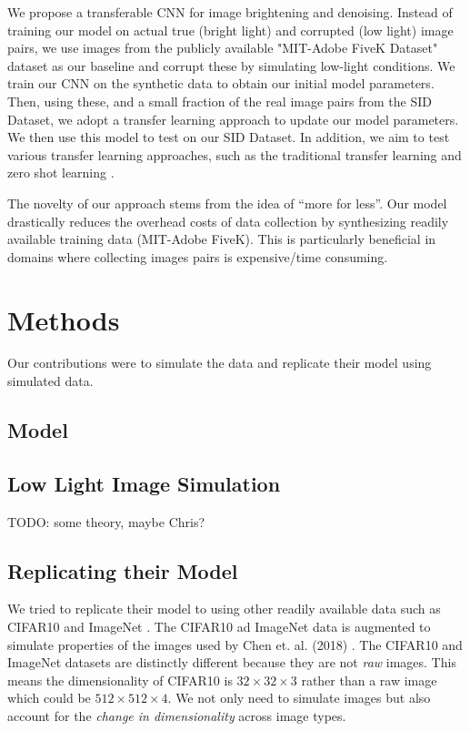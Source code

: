 \documentclass{article}
\begin{document}
We propose a transferable CNN for image brightening and denoising. Instead
of training our model on actual true (bright light) and corrupted
(low light) image pairs, we use images from the publicly available
"MIT-Adobe FiveK Dataset" dataset as our baseline and corrupt these by simulating
low-light conditions. We train our CNN on the synthetic data to obtain our initial
model parameters. Then, using these, and a small fraction of the real image pairs
from the SID Dataset, we adopt a transfer learning \cite{Goodfellow-et-al-2016}
approach to update our model parameters. We then use this model to test on our
SID Dataset. In addition, we aim to test various transfer learning approaches,
such as the traditional transfer learning and zero shot learning \cite{larochelle2008,
  NIPS2009_3650, socher2013zeroshot}.\newline

The novelty of our approach stems from the idea of ``more for less''. Our
model drastically reduces the overhead costs of data collection by
synthesizing readily available training data (MIT-Adobe FiveK). This is
particularly beneficial in domains where collecting images pairs is
expensive/time consuming. 

\section{Methods}

Our contributions were to simulate the data and replicate their model
using simulated data.

\subsection{Model}




\subsection{Low Light Image Simulation}

TODO: some theory, maybe Chris?

\subsection{Replicating their Model}

We tried to replicate their model to using other readily
available data such as CIFAR10 \cite{cifar10} and ImageNet
\cite{imagenet_cvpr09}. The CIFAR10 ad ImageNet data is augmented to
simulate properties of the images used by Chen et. al. (2018)
\cite{chen2018learning}. The CIFAR10 and ImageNet datasets are distinctly
different because they are not \textit{raw} images. This means the
dimensionality of CIFAR10 is $32 \times 32 \times 3$ rather than a raw
image which could be $512 \times 512 \times 4$. We not only need to
simulate images but also account for the \textit{change in dimensionality}
across image types.
\end{document}
